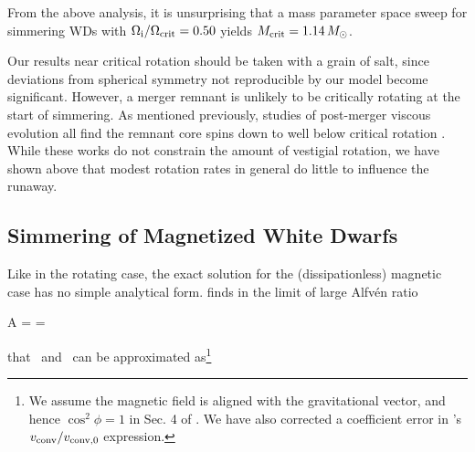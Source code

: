
From the above analysis, it is unsurprising that a mass parameter space sweep for simmering WDs with $\Ominit/\Omcrit = 0.50$ yields $\Mcrit = 1.14\,\Msun$.  


Our results near critical rotation should be taken with a grain of salt, since deviations from spherical symmetry not reproducible by our model become significant. However, a merger remnant is unlikely to be critically rotating at the start of simmering.  As mentioned previously, studies of post-merger viscous evolution all find the remnant core spins down to well below critical rotation \citep{shen+12,schw+12,ji+13}.  While these works do not constrain the amount of vestigial rotation, we have shown above that modest rotation rates in general do little to influence the runaway.

\subsection{Simmering of Magnetized White Dwarfs}
\label{ssec:c5_runaway_mhd}

Like in the rotating case, the exact solution for the (dissipationless) magnetic case has no simple analytical form.  \citeal{stev79} finds in the limit of large Alfv\'{e}n ratio

\eqbegin
A =  = 
\label{eq:c5_alfven_ratio}
\eqend

\noindent that \dnabmag\ and \vconv\ can be approximated as\footnote{We assume the magnetic field is aligned with the gravitational vector, and hence $\cos^2\phi = 1$ in Sec. 4 of \citeal{stev79}.  We have also corrected a coefficient error in \citeal{stev79}'s $\vconv/\vconvzero$ expression.}


